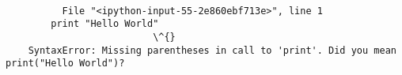 \documentclass[11pt]{article}
\begin{document}
    \begin{Verbatim}[commandchars=\\\{\}]

          File "<ipython-input-55-2e860ebf713e>", line 1
        print "Hello World"
                          \^{}
    SyntaxError: Missing parentheses in call to 'print'. Did you mean print("Hello World")?
    

    \end{Verbatim}


    
    
    
    
\end{document}
